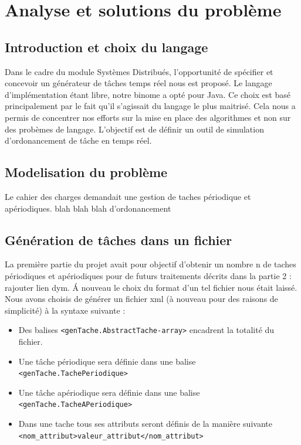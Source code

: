 \chapter{Analyse et solutions du problème}

\section{Introduction et choix du langage}
Dans le cadre du module Systèmes Distribués, l'opportunité de  spécifier et concevoir  un générateur de tâches temps réel nous est proposé. Le langage d'implémentation étant libre, notre binome a opté pour Java. Ce choix est basé principalement par le fait qu'il s'agissait du langage le plus maitrisé. Cela nous a permis de concentrer nos efforts sur la mise en place des algorithmes et non sur des probèmes de langage.
 L'objectif est de définir un outil de simulation  d'ordonancement de tâche en temps réel.

\section{Modelisation du problème}
Le cahier des charges demandait une gestion de taches périodique et apériodiques. blah blah blah d'ordonancement
\section{Génération de tâches dans un fichier}
La première partie du projet avait pour objectif d'obtenir un nombre n de taches périodiques et apériodiques pour de futurs traitements décrits dans la partie 2 : rajouter lien dym. \'A nouveau le choix du format d'un tel fichier nous était laissé. Nous avons choisis de générer un fichier xml (à nouveau pour des raisons  de simplicité) à la syntaxe suivante : 

\begin{itemize}
\item
Des balises \verb+<genTache.AbstractTache-array>+ encadrent la totalité du fichier.
\item
Une tâche périodique sera définie dans une balise  \verb+<genTache.TachePeriodique>+ 
\item
Une tâche apériodique sera définie dans une balise  \verb+<genTache.TacheAPeriodique>+ 
\item
Dans une tache tous ses attributs seront définis de la manière suivante \verb+<nom_attribut>valeur_attribut</nom_attribut>+
\end{itemize}


